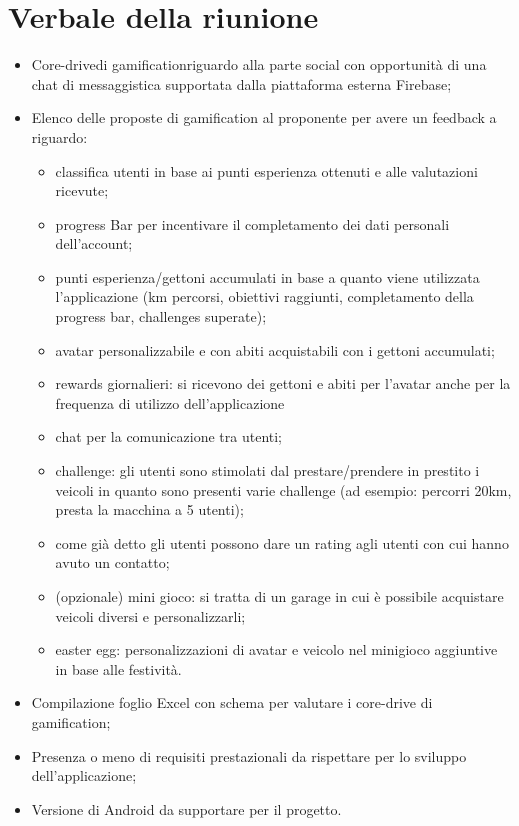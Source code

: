 \section{Verbale della riunione}
\begin{itemize}
	\item Core-drive\glosp di gamification\glosp riguardo alla parte social con opportunità di una chat di messaggistica supportata dalla piattaforma esterna Firebase\glo;
	\item Elenco delle proposte di gamification al proponente per avere un feedback a riguardo:
		\begin{itemize}
			\item classifica utenti in base ai punti esperienza ottenuti e alle valutazioni ricevute;
			\item progress Bar per incentivare il completamento dei dati personali dell'account;
			\item punti esperienza/gettoni accumulati in base a quanto viene utilizzata l'applicazione (km percorsi, obiettivi raggiunti, completamento della progress bar, challenges superate);
			\item avatar personalizzabile e con abiti acquistabili con i gettoni accumulati;
			\item rewards giornalieri: si ricevono dei gettoni e abiti per l'avatar anche per la frequenza di utilizzo dell'applicazione
			\item chat per la comunicazione tra utenti;
			\item challenge: gli utenti sono stimolati dal prestare/prendere in prestito i veicoli in quanto sono presenti varie challenge (ad esempio: percorri  20km, presta la macchina a 5 utenti);
			\item come già detto gli utenti possono dare un rating agli utenti con cui hanno avuto un contatto;
			\item (opzionale) mini gioco: si tratta di un garage in cui è possibile acquistare veicoli diversi e personalizzarli;
			\item easter egg: personalizzazioni di avatar e veicolo nel minigioco aggiuntive in base alle festività.
		\end{itemize}
	\item Compilazione foglio Excel con schema per valutare i core-drive di gamification;
	\item Presenza o meno di requisiti prestazionali da rispettare per lo sviluppo dell'applicazione;
	\item Versione di Android da supportare per il progetto.
\end{itemize} 
\pagebreak
